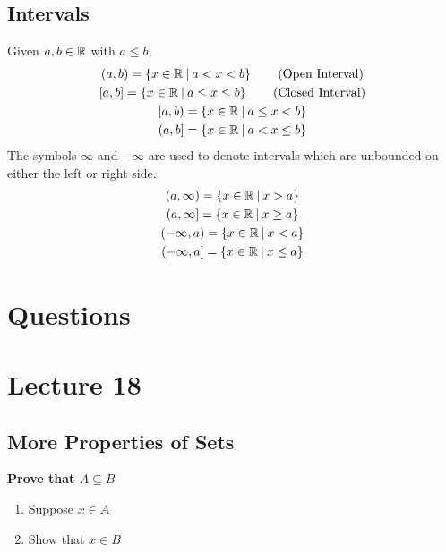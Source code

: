 \documentclass{report}
\begin{document}
\subsection*{Intervals}
Given $a,b\in\mathbb{R}$ with $a\leq b$,
\begin{gather*}
	(a,b) = \braces{x\in\bbr\suchthat a < x < b} \tag*{(\text{Open Interval})} \\
	[a,b] = \braces{x\in\bbr\suchthat a \leq x \leq b} \tag*{(\text{Closed Interval})} \\
	[a,b) = \braces{x\in\bbr\suchthat a \leq x < b} \\
	(a,b] = \braces{x\in\bbr\suchthat a < x \leq b} \\
\end{gather*}
The symbols $\infty$ and $-\infty$ are used to denote intervals which are unbounded on either the left or right side.
\begin{gather*}
	(a, \infty) = \left\lbrace x\in\mathbb{R}\medspace\middle|\medspace x > a \right\rbrace \\
	(a, \infty] = \left\lbrace x\in\mathbb{R}\medspace\middle|\medspace x \geq a \right\rbrace \\
	(-\infty, a) = \left\lbrace x\in\mathbb{R}\medspace\middle|\medspace x < a \right\rbrace \\
	(-\infty, a] = \left\lbrace x\in\mathbb{R}\medspace\middle|\medspace x \leq a \right\rbrace \\
\end{gather*} 

\section*{Questions}
\qs{}{}

\newpage
\section{Lecture 18}
\subsection*{More Properties of Sets}
\textbf{Prove that $A\subseteq B$}
\begin{enumerate}
	\item Suppose $x\in A$
	\item Show that $x\in B$
\end{enumerate}
\end{document}
